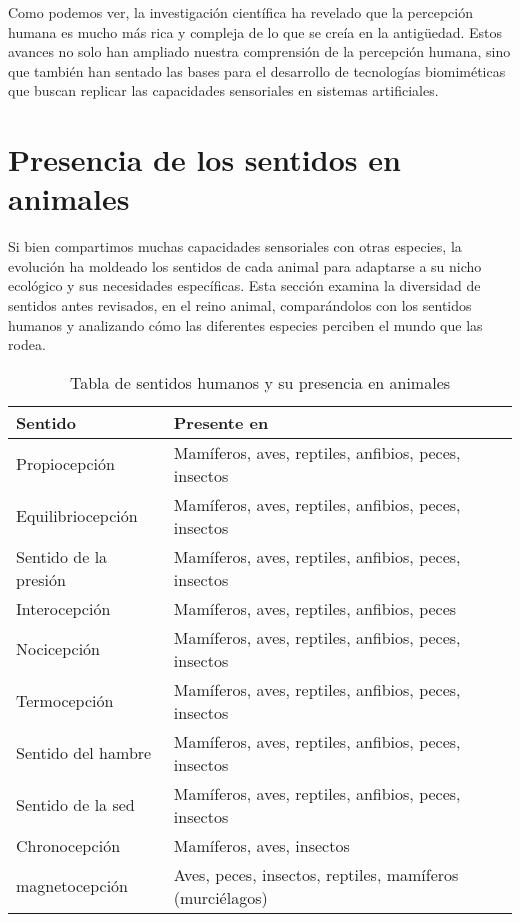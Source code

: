 \documentclass[conference]{IEEEtran}
\begin{document}
Como podemos ver, la investigación científica ha revelado que la percepción humana es mucho más rica y compleja de lo que se creía en la antigüedad. Estos avances no solo han ampliado nuestra comprensión de la  percepción humana,  sino que también han sentado las bases para el desarrollo de tecnologías biomiméticas que buscan replicar las capacidades sensoriales en sistemas artificiales.\\



\bigskip
\section{Presencia de los sentidos en animales}

Si bien compartimos muchas capacidades sensoriales con otras especies,  la evolución ha moldeado los sentidos de cada animal para adaptarse a su nicho ecológico y sus necesidades específicas.  Esta sección examina la diversidad de sentidos antes revisados, en el reino animal, comparándolos con los sentidos humanos y analizando cómo las diferentes especies perciben el mundo que las rodea.\\

\begin{table}[H]
\centering
\caption{Tabla de sentidos humanos y su presencia en animales}
\label{tabla:sentidos_animales}
\begin{tabular}{|p{4cm}|p{4cm}|}  %
\hline
\textbf{Sentido} & \textbf{Presente en} \\
\hline
Propiocepción & Mamíferos, aves, reptiles, anfibios, peces, insectos  \\
Equilibriocepción & Mamíferos, aves, reptiles, anfibios, peces, insectos  \\
Sentido de la presión & Mamíferos, aves, reptiles, anfibios, peces, insectos  \\
Interocepción & Mamíferos, aves, reptiles, anfibios, peces  \\
Nocicepción & Mamíferos, aves, reptiles, anfibios, peces, insectos  \\
Termocepción & Mamíferos, aves, reptiles, anfibios, peces, insectos  \\
Sentido del hambre & Mamíferos, aves, reptiles, anfibios, peces, insectos  \\
Sentido de la sed & Mamíferos, aves, reptiles, anfibios, peces, insectos  \\
Chronocepción & Mamíferos, aves, insectos  \\
magnetocepción & Aves, peces, insectos, reptiles, mamíferos (murciélagos)  \\
\hline
\end{tabular}
\end{table}
    
\end{document}
